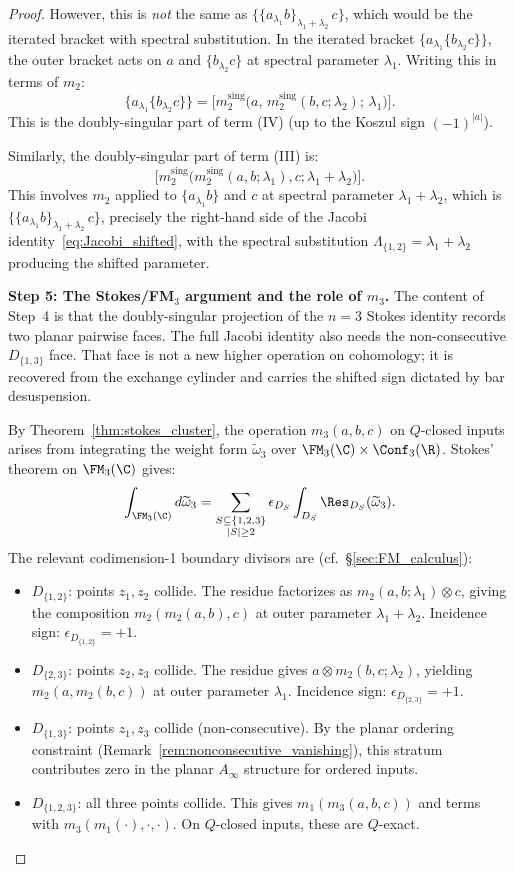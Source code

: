 \begin{proof}
However, this is \emph{not} the same as $\{\{a_{\lambda_1} b\}_{\lambda_1+\lambda_2}\, c\}$, which would be the iterated bracket with spectral substitution. In the iterated bracket $\{a_{\lambda_1}\{b_{\lambda_2} c\}\}$, the outer bracket acts on $a$ and $\{b_{\lambda_2} c\}$ at spectral parameter $\lambda_1$. Writing this in terms of $m_2$:
\[
\{a_{\lambda_1}\{b_{\lambda_2} c\}\} = \bigl[m_2^{\mathrm{sing}}\bigl(a,\, m_2^{\mathrm{sing}}(b,c;\lambda_2);\, \lambda_1\bigr)\bigr].
\]
This is the doubly-singular part of term (IV) (up to the Koszul sign $(-1)^{|a|}$).

Similarly, the doubly-singular part of term (III) is:
\[
\bigl[m_2^{\mathrm{sing}}\bigl(m_2^{\mathrm{sing}}(a,b;\lambda_1),c;\lambda_1{+}\lambda_2\bigr)\bigr].
\]
This involves $m_2$ applied to $\{a_{\lambda_1} b\}$ and $c$ at spectral parameter $\lambda_1 + \lambda_2$, which is $\{\{a_{\lambda_1} b\}_{\lambda_1+\lambda_2}\, c\}$, precisely the right-hand side of the Jacobi identity~\eqref{eq:Jacobi_shifted}, with the spectral substitution $\Lambda_{\{1,2\}} = \lambda_1 + \lambda_2$ producing the shifted parameter.

\medskip
\textbf{Step 5: The Stokes/FM$_3$ argument and the role of $m_3$.}
The content of Step~4 is that the doubly-singular projection of the
$n=3$ Stokes identity records two planar pairwise faces. The full
Jacobi identity also needs the non-consecutive $D_{\{1,3\}}$ face.
That face is not a new higher operation on cohomology; it is recovered
from the exchange cylinder and carries the shifted sign dictated by
bar desuspension.

By Theorem~\ref{thm:stokes_cluster}, the operation $m_3(a,b,c)$ on $Q$-closed inputs arises from integrating the weight form $\widetilde{\omega}_3$ over $\FM_3(\C) \times \Conf_3(\R)$. Stokes' theorem on $\FM_3(\C)$ gives:
\[
\int_{\FM_3(\C)} d\widetilde{\omega}_3
= \sum_{\substack{S \subseteq \{1,2,3\} \\ |S| \geq 2}}
\epsilon_{D_S}\int_{D_S}\Res_{D_S}(\widetilde{\omega}_3).
\]
The relevant codimension-1 boundary divisors are (cf.\ \S\ref{sec:FM_calculus}):
\begin{itemize}
\item $D_{\{1,2\}}$: points $z_1,z_2$ collide. The residue factorizes as $m_2(a,b;\lambda_1) \otimes c$, giving the composition $m_2(m_2(a,b),c)$ at outer parameter $\lambda_1+\lambda_2$. Incidence sign: $\epsilon_{D_{\{1,2\}}} = +1$.
\item $D_{\{2,3\}}$: points $z_2,z_3$ collide. The residue gives $a \otimes m_2(b,c;\lambda_2)$, yielding $m_2(a,m_2(b,c))$ at outer parameter $\lambda_1$. Incidence sign: $\epsilon_{D_{\{2,3\}}} = +1$.
\item $D_{\{1,3\}}$: points $z_1,z_3$ collide (non-consecutive). By the planar ordering constraint (Remark~\ref{rem:nonconsecutive_vanishing}), this stratum contributes zero in the planar $A_\infty$ structure for ordered inputs.
\item $D_{\{1,2,3\}}$: all three points collide. This gives $m_1(m_3(a,b,c))$ and terms with $m_3(m_1(\cdot),\cdot,\cdot)$. On $Q$-closed inputs, these are $Q$-exact.
\end{itemize}


\end{proof}
